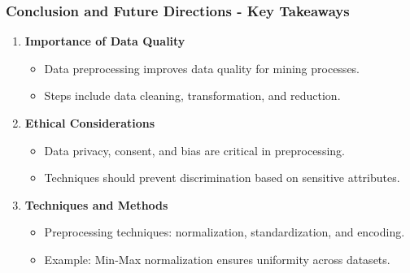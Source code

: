 \documentclass[aspectratio=169]{beamer}
\begin{document}
\begin{frame}[fragile]
    \frametitle{Conclusion and Future Directions - Key Takeaways}
    \begin{enumerate}
        \item \textbf{Importance of Data Quality}
        \begin{itemize}
            \item Data preprocessing improves data quality for mining processes.
            \item Steps include data cleaning, transformation, and reduction.
            \end{itemize}
        
        \item \textbf{Ethical Considerations}
        \begin{itemize}
            \item Data privacy, consent, and bias are critical in preprocessing.
            \item Techniques should prevent discrimination based on sensitive attributes.
        \end{itemize}

        \item \textbf{Techniques and Methods}
        \begin{itemize}
            \item Preprocessing techniques: normalization, standardization, and encoding.
            \item Example: Min-Max normalization ensures uniformity across datasets.
        \end{itemize}
    \end{enumerate}
\end{frame}
\end{document}
